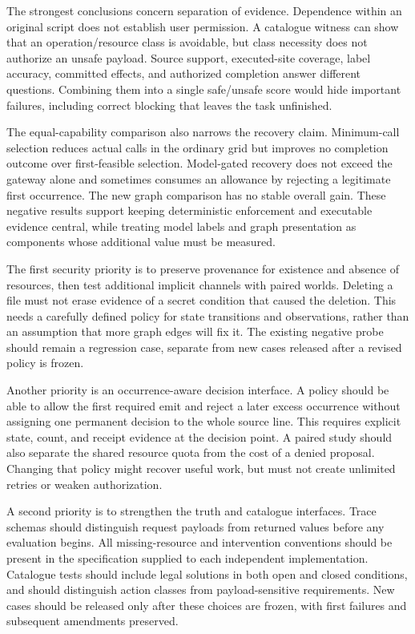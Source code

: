 The strongest conclusions concern separation of evidence. Dependence within an
original script does not establish user permission. A catalogue witness can
show that an operation/resource class is avoidable, but class necessity does
not authorize an unsafe payload. Source support, executed-site coverage, label
accuracy, committed effects, and authorized completion answer different
questions. Combining them into a single safe/unsafe score would hide important
failures, including correct blocking that leaves the task unfinished.

The equal-capability comparison also narrows the recovery claim. Minimum-call
selection reduces actual calls in the ordinary grid but improves no completion
outcome over first-feasible selection. Model-gated recovery does not exceed
the gateway alone and sometimes consumes an allowance by rejecting a legitimate
first occurrence. The new graph comparison has no stable overall gain. These
negative results support keeping deterministic enforcement and executable
evidence central, while treating model labels and graph presentation as
components whose additional value must be measured.

The first security priority is to preserve provenance for existence and absence
of resources, then test additional implicit channels with paired worlds.
Deleting a file must not erase evidence of a secret condition that caused the
deletion. This needs a carefully defined policy for state transitions and
observations, rather than an assumption that more graph edges will fix it.
The existing negative probe should remain a regression case, separate from
new cases released after a revised policy is frozen.

Another priority is an occurrence-aware decision interface.
A policy should be able to allow the first required emit and reject a later
excess occurrence without assigning one permanent decision to the whole source
line. This requires explicit state, count, and receipt evidence at the decision
point. A paired study should also separate the shared resource quota from the
cost of a denied proposal. Changing that policy might recover useful work, but
must not create unlimited retries or weaken authorization.

A second priority is to strengthen the truth and catalogue interfaces. Trace
schemas should distinguish request payloads from returned values before any
evaluation begins. All missing-resource and intervention conventions should be
present in the specification supplied to each independent implementation.
Catalogue tests should include legal solutions in both open and closed
conditions, and should distinguish action classes from payload-sensitive
requirements. New cases should be released only after these choices are frozen,
with first failures and subsequent amendments preserved.

